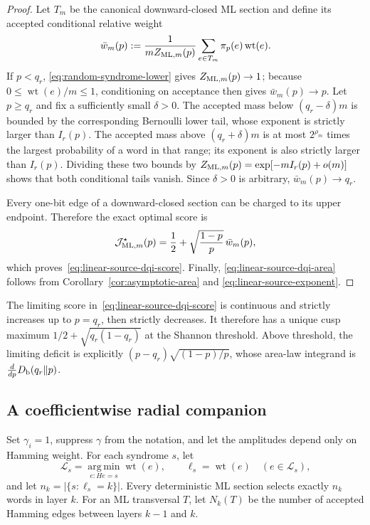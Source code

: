 \documentclass[journal]{IEEEtran}
\theoremstyle{definition}
\theoremstyle{remark}
\newcommand{\wt}{\operatorname{wt}}
\begin{document}
\begin{proof}
Let $T_m$ be the canonical downward-closed ML section and define its
accepted conditional relative weight
\begin{equation}
 \bar w_m(p):=\frac{1}{mZ_{{\rm ML},m}(p)}
 \sum_{e\in T_m}\pi_p(e)\wt(e).
 \label{eq:accepted-relative-weight}
\end{equation}
If $p<q_r$, \eqref{eq:random-syndrome-lower} gives $Z_{{\rm ML},m}(p)\to1$;
because $0\le \wt(e)/m\le1$, conditioning on acceptance then gives
$\bar w_m(p)\to p$.  Let $p\ge q_r$ and fix a sufficiently small
$\delta>0$.  The accepted mass below $(q_r-\delta)m$ is bounded by the
corresponding Bernoulli lower tail, whose exponent is strictly larger than
$I_r(p)$.  The accepted mass above $(q_r+\delta)m$ is at most
$2^{\rho_m}$ times the largest probability of a word in that range; its
exponent is also strictly larger than $I_r(p)$.  Dividing these two bounds by
$Z_{{\rm ML},m}(p)=\exp[-mI_r(p)+o(m)]$ shows that both conditional tails
vanish.  Since $\delta>0$ is arbitrary, $\bar w_m(p)\to q_r$.

Every one-bit edge of a downward-closed section can be charged to its upper
endpoint.  Therefore the exact optimal score is
\begin{equation}
 \mathcal J_{{\rm ML},m}^{\star}(p)
 =\frac12+\sqrt{\frac{1-p}{p}}\,\bar w_m(p),
 \label{eq:score-from-accepted-weight}
\end{equation}
which proves~\eqref{eq:linear-source-dqi-score}.  Finally,
\eqref{eq:linear-source-dqi-area} follows from
Corollary~\ref{cor:asymptotic-area} and
\eqref{eq:linear-source-exponent}.
\end{proof}

The limiting score in~\eqref{eq:linear-source-dqi-score} is continuous and
strictly increases up to $p=q_r$, then strictly decreases.  It therefore has
a unique cusp maximum $1/2+\sqrt{q_r(1-q_r)}$ at the Shannon threshold.  Above
threshold, the limiting deficit is explicitly
$(p-q_r)\sqrt{(1-p)/p}$, whose area-law integrand is
$\frac{d}{dp}D_{\rm b}(q_r\Vert p)$.

\subsection{A coefficientwise radial companion}

Set $\gamma_i=1$, suppress $\gamma$ from the notation, and let the amplitudes
depend only on Hamming weight.
For each syndrome $s$, let
\begin{equation}
 \mathcal L_s=\operatorname*{arg\,min}_{e:He=s}\wt(e),
 \qquad \ell_s=\wt(e)\quad(e\in\mathcal L_s),
 \label{eq:ml-list}
\end{equation}
and let $n_k=|\{s:\ell_s=k\}|$.  Every deterministic ML section selects
exactly $n_k$ words in layer $k$.  For an ML transversal $T$, let $N_k(T)$
be the number of accepted Hamming edges between layers $k-1$ and $k$.
\end{document}
